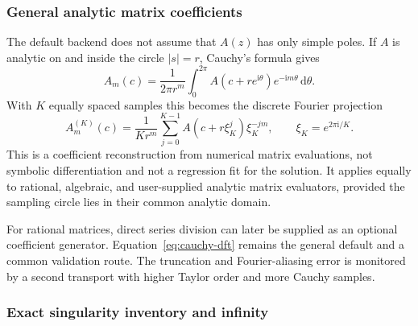\documentclass[11pt]{article}
\newcommand{\dd}{\mathrm d}
\renewcommand{\_}{\origunderscore\allowbreak}
\begin{document}
\subsubsection{General analytic matrix coefficients}

The default backend does not assume that $A(z)$ has only simple poles.  If $A$ is analytic
on and inside the circle $|s|=r$, Cauchy's formula gives
\begin{equation}
  A_m(c)=\frac{1}{2\pi r^m}\int_0^{2\pi}
  A(c+r e^{\mathrm i\theta})e^{-\mathrm i m\theta}\,\dd\theta.
\end{equation}
With $K$ equally spaced samples this becomes the discrete Fourier projection
\begin{equation}
  A_m^{(K)}(c)=\frac{1}{K r^m}\sum_{j=0}^{K-1}
  A(c+r\xi_K^j)\xi_K^{-jm},
  \qquad \xi_K=e^{2\pi\mathrm i/K}.
  \label{eq:cauchy-dft}
\end{equation}
This is a coefficient reconstruction from numerical matrix evaluations, not symbolic
differentiation and not a regression fit for the solution.  It applies equally to rational,
algebraic, and user-supplied analytic
matrix evaluators, provided the sampling circle lies in their common analytic domain.

For rational matrices, direct series division can later be supplied as an optional
coefficient generator.  Equation~\eqref{eq:cauchy-dft} remains the general default and a
common validation route.  The truncation and Fourier-aliasing error is monitored by a second
transport with higher Taylor order and more Cauchy samples.

\subsubsection{Exact singularity inventory and infinity}
\label{subsec:singularity-inventory}
\end{document}

